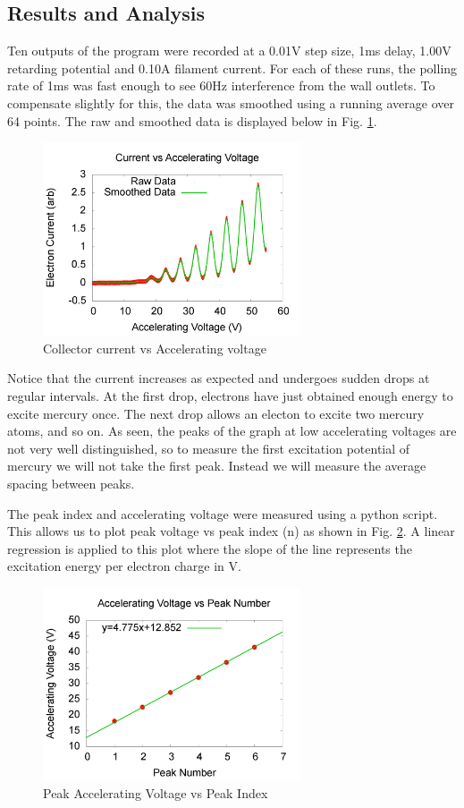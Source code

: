 \documentclass[12pt,twocolumn]{article}
\begin{document}
\subsection{Results and Analysis}

Ten outputs of the program were recorded at a 0.01V step size, 1ms delay, 1.00V retarding potential and 0.10A filament current. For each of these runs, the polling rate of 1ms was fast enough to see 60Hz interference from the wall outlets. To compensate slightly for this, the data was smoothed using a running average over 64 points. The raw and smoothed data is displayed below in Fig. \ref{fig:HgData}.

\begin{figure}[h!]
	\centering
	\includegraphics[width=3in]{images/Hg-smoothed}
	\caption{Collector current vs Accelerating voltage}
	\label{fig:HgData}
\end{figure}

Notice that the current increases as expected and undergoes sudden drops at regular intervals. At the first drop, electrons have just obtained enough energy to excite mercury once. The next drop allows an electon to excite two mercury atoms, and so on. As seen, the peaks of the graph at low accelerating voltages are not very well distinguished, so to measure the first excitation potential of mercury we will not take the first peak. Instead we will measure the average spacing between peaks.

The peak index and accelerating voltage were measured using a python script. This allows us to plot peak voltage vs peak index (n) as shown in Fig. \ref{fig:HgLine}. A linear regression is applied to this plot where the slope of the line represents the excitation energy per electron charge in V.

\begin{figure}[h!]
	\centering
	\includegraphics[width=3in]{images/HgLine}
	\caption{Peak Accelerating Voltage vs Peak Index}
	\label{fig:HgLine}
\end{figure}
\end{document}
